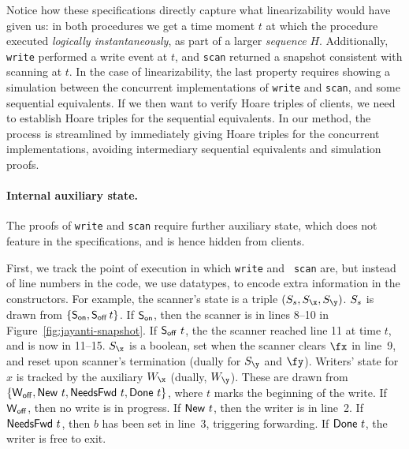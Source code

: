 
Notice how these specifications directly capture what linearizability
would have given us: in both procedures we get a time moment $t$ at
which the procedure executed \emph{logically instantaneously}, as part
of a larger \emph{sequence} $H$. Additionally, {\tt write} performed a
write event at $t$, and {\tt scan} returned a snapshot consistent with
scanning at $t$. In the case of linearizability, the last property
requires showing a simulation between the concurrent implementations
of {\tt write} and {\tt scan}, and some sequential equivalents. If we
then want to verify Hoare triples of clients, we need to establish
Hoare triples for the sequential equivalents. In our method, the
process is streamlined by immediately giving Hoare triples for the
concurrent implementations, avoiding intermediary sequential
equivalents and simulation proofs.

\paragraph*{Internal auxiliary state.} 
The proofs of {\tt write} and {\tt scan} require further auxiliary
state, which does not feature in the specifications, and is hence
hidden from clients.

First, we track the point of execution in which {\tt write} and {\tt
  scan} are, but instead of line numbers in the code, we use
datatypes, to encode extra information in the constructors.
%
For example, the scanner's state is a triple $(\sss, \sx,
\sy)$. $S_s$ is drawn from $\{ \mathsf{S_{on}}, \mathsf{S_{off}}\, t\}$. If $\mathsf{S_{on}}$, then
the scanner is in lines 8--10 in Figure~\ref{fig:jayanti-snapshot}. If
$\mathsf{S_{off}}\ t$, the the scanner reached line 11 at time $t$, and is now in
11--15.  $\sx$ is a boolean, set when the scanner clears $\fx$ in
line~9, and reset upon scanner's termination (dually for $\sy$ and
$\fy$).
%
Writers' state for $x$ is tracked by the auxiliary $\wx$ (dually,
$\wy$). These are drawn from $\{\mathsf{W_{off}}, \mathsf{New}\ t, \mathsf{NeedsFwd}\ t,
\mathsf{Done}\ t\}$, where $t$ marks the beginning of the write. If
$\mathsf{W_{off}}$, then no write is in progress. If $\mathsf{New}\ t$, then the
writer is in line~2. If $\mathsf{NeedsFwd}\ t$, then $b$ has been set in line~3,
triggering forwarding. If $\mathsf{Done}\ t$, the writer is free to exit.


